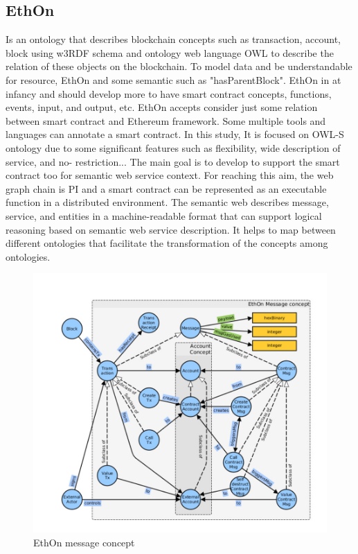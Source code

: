 \subsection{EthOn}
Is an ontology that describes blockchain concepts such as transaction, account, block using w3RDF
schema and ontology web language OWL to describe the relation of these objects on the blockchain.
To model data and be understandable for resource, EthOn and some semantic such as "hasParentBlock".
EthOn in at infancy and should develop more to have smart contract concepts, functions, events, input, and output, etc.
EthOn accepts consider just some relation between smart contract and Ethereum framework. Some multiple tools and languages can annotate a smart contract. In this study, It is focused on OWL-S ontology due to some significant features such as flexibility, wide description of service, and no- restriction... 
The main goal is to develop to support the smart contract too for semantic web service context.
For reaching this aim, the web graph chain is PI and a smart contract can be represented as an executable function in a distributed environment. The semantic web describes message, service, and entities in a machine-readable format that can support logical reasoning based on semantic web service description. It helps to map between different ontologies that facilitate the transformation of the concepts among ontologies\cite{Baqa}. 

\begin{center}
	\begin{figure}[htb!]
		
		\begin{minipage}{0.55\linewidth}
			\centering
			\includegraphics[width=1.65\textwidth]{images/chap02_EthOn.jpg}
		\end{minipage}
		\caption[EthOn message concept]{EthOn message concept\cite{Baqa}}
		
	\end{figure}
	
\end{center}



